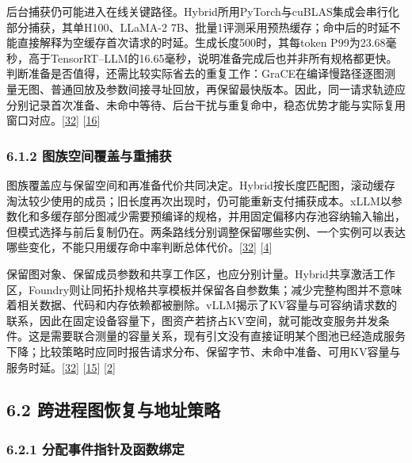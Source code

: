 \documentclass[
  11pt,
  UTF8]{ctexart}
\begin{document}
后台捕获仍可能进入在线关键路径。Hybrid所用PyTorch与cuBLAS集成会串行化部分捕获，其单H100、LLaMA-2
7B、批量1评测采用预热缓存；命中后的时延不能直接解释为空缓存首次请求的时延。生成长度500时，其每token
P99为23.68毫秒，高于TensorRT--LLM的16.65毫秒，说明准备完成后也并非所有规格都更快。判断准备是否值得，还需比较实际省去的重复工作：GraCE在编译慢路径逐图测量无图、普通回放及参数间接寻址回放，再保留最快版本。因此，同一请求轨迹应分别记录首次准备、未命中等待、后台干扰与重复命中，稳态优势才能与实际复用窗口对应。{[}\protect\hyperlink{ref-yadav2026hybridpreprint}{32}{]}
{[}\protect\hyperlink{ref-ghosh2026grace}{16}{]}

\hypertarget{section-6-1-2}{%
\subsubsection{6.1.2 图族空间覆盖与重捕获}\label{section-6-1-2}}

图族覆盖应与保留空间和再准备代价共同决定。Hybrid按长度匹配图，滚动缓存淘汰较少使用的成员；旧长度再次出现时，仍可能重新支付捕获成本。xLLM以参数化和多缓存部分图减少需要预编译的规格，并用固定偏移内存池容纳输入输出，但模式选择与前后复制仍在。两条路线分别调整保留哪些实例、一个实例可以表达哪些变化，不能只用缓存命中率判断总体代价。{[}\protect\hyperlink{ref-yadav2026hybridpreprint}{32}{]}
{[}\protect\hyperlink{ref-liu2025xllm}{4}{]}

保留图对象、保留成员参数和共享工作区，也应分别计量。Hybrid共享激活工作区，Foundry则让同拓扑规格共享模板并保留各自参数集；减少完整构图并不意味着相关数据、代码和内存依赖都被删除。vLLM揭示了KV容量与可容纳请求数的联系，因此在固定设备容量下，图资产若挤占KV空间，就可能改变服务并发条件。这是需要联合测量的容量关系，现有引文没有直接证明某个图池已经造成服务下降；比较策略时应同时报告请求分布、保留字节、未命中准备、可用KV容量与服务时延。{[}\protect\hyperlink{ref-yadav2026hybridpreprint}{32}{]}
{[}\protect\hyperlink{ref-liu2026foundry}{15}{]}
{[}\protect\hyperlink{ref-kwon2023vllm}{2}{]}

\hypertarget{section-6-2}{%
\subsection{6.2 跨进程图恢复与地址策略}\label{section-6-2}}

\hypertarget{section-6-2-1}{%
\subsubsection{6.2.1 分配事件指针及函数绑定}\label{section-6-2-1}}
\end{document}
